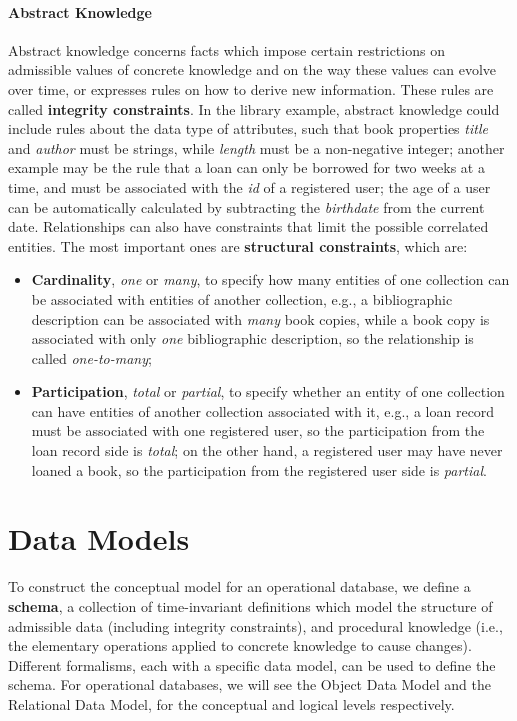\paragraph{Abstract Knowledge} Abstract knowledge concerns facts which impose certain restrictions on admissible values of concrete knowledge and on the way these values can evolve over time, or expresses rules on how to derive new information. These rules are called \textbf{integrity constraints}. In the library example, abstract knowledge could include rules about the data type of attributes, such that book properties \textit{title} and \textit{author} must be strings, while \textit{length} must be a non-negative integer; another example may be the rule that a loan can only be borrowed for two weeks at a time, and must be associated with the \textit{id} of a registered user; the age of a user can be automatically calculated by subtracting the \textit{birthdate} from the current date. Relationships can also have constraints that limit the possible correlated entities. The most important ones are \textbf{structural constraints}, which are:
\begin{itemize}
    \item \textbf{Cardinality}, \textit{one} or \textit{many}, to specify how many entities of one collection can be associated with entities of another collection, e.g., a bibliographic description can be associated with \textit{many} book copies, while a book copy is associated with only \textit{one} bibliographic description, so the relationship is called \textit{one-to-many};
    \item \textbf{Participation}, \textit{total} or \textit{partial}, to specify whether an entity of one collection can have entities of another collection associated with it, e.g., a loan record must be associated with one registered user, so the participation from the loan record side is \textit{total}; on the other hand, a registered user may have never loaned a book, so the participation from the registered user side is \textit{partial}. 
\end{itemize}

\section{Data Models}

To construct the conceptual model for an operational database, we define a \textbf{schema}, a collection of time-invariant definitions which model the structure of admissible data (including integrity constraints), and procedural knowledge (i.e., the elementary operations applied to concrete knowledge to cause changes). Different formalisms, each with a specific data model, can be used to define the schema.
For operational databases, we will see the Object Data Model and the Relational Data Model, for the conceptual and logical levels respectively.

